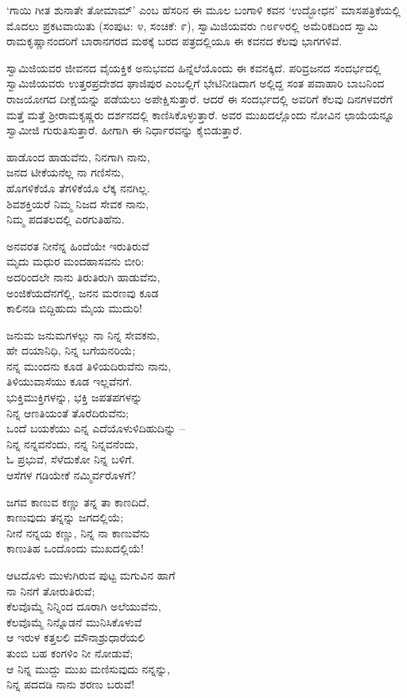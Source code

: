 ‘ಗಾಯಿ ಗೀತ ಶುನಾತೇ ತೋಮಾಮ್’ ಎಂಬ ಹೆಸರಿನ ಈ ಮೂಲ ಬಂಗಾಳಿ ಕವನ ‘ಉದ್ಭೋಧನ’ ಮಾಸಪತ್ರಿಕೆಯಲ್ಲಿ ಮೊದಲು ಪ್ರಕಟವಾಯಿತು (ಸಂಪುಟ: ೪, ಸಂಚಿಕೆ: ೯), ಸ್ವಾಮಿಜಿಯವರು ೧೮೯೪ರಲ್ಲಿ ಅಮೆರಿಕದಿಂದ ಸ್ವಾಮಿ ರಾಮಕೃಷ್ಣಾನಂದರಿಗೆ ಬಾರಾನಗರದ ಮಠಕ್ಕೆ ಬರದ ಪತ್ರದಲ್ಲಿಯೂ ಈ ಕವನದ ಕೆಲವು ಭಾಗಗಳಿವೆ.

ಸ್ವಾಮಿಜಿಯವರ ಜೀವನದ ವೈಯಕ್ತಿಕ ಅನುಭವದ ಹಿನ್ನೆಲೆಯೊಂದು ಈ ಕವನಕ್ಕಿದೆ. ಪರಿವ್ರಜನದ ಸಂದರ್ಭದಲ್ಲಿ ಸ್ವಾಮಿಜಿಯವರು ಉತ್ತರಪ್ರದೇಶದ ಘಾಜಿಪುರ ಎಂಬಲ್ಲಿಗೆ ಭೇಟಿನೀಡಿದಾಗ ಅಲ್ಲಿದ್ದ ಸಂತ ಪವಾಹಾರಿ ಬಾಬನಿಂದ ರಾಜಯೋಗದ ದೀಕ್ಷೆಯನ್ನು ಪಡೆಯಲು ಅಪೇಕ್ಷಿಸುತ್ತಾರೆ. ಆದರೆ ಈ ಸಂದರ್ಭದಲ್ಲಿ ಅವರಿಗೆ ಕೆಲವು ದಿನಗಳವರೆಗೆ ಮತ್ತೆ ಮತ್ತೆ ಶ‍್ರೀರಾಮಕೃಷ್ಣರು ದರ್ಶನದಲ್ಲಿ ಕಾಣಿಸಿಕೊಳ್ಳುತ್ತಾರೆ. ಅವರ ಮುಖದಲ್ಲೊಂದು ನೋವಿನ ಛಾಯೆಯನ್ನೂ ಸ್ವಾಮೀಜಿ ಗುರುತಿಸುತ್ತಾರೆ. ಹೀಗಾಗಿ ಈ ನಿರ್ಧಾರವನ್ನು ಕೈಬಿಡುತ್ತಾರೆ.

ಹಾಡೊಂದ ಹಾಡುವೆನು, ನಿನಗಾಗಿ ನಾನು,\\ಜನದ ಟೀಕೆಯನೆಲ್ಲ ನಾ ಗಣಿಸೆನು,\\ಹೊಗಳಿಕೆಯೊ ತೆಗಳಿಕೆಯೊ ಲೆಕ್ಕ ನನಗಿಲ್ಲ.\\ಶಿವಶಕ್ತಿಯರೆ ನಿಮ್ಮ ನಿಜದ ಸೇವಕ ನಾನು,\\ನಿಮ್ಮ ಪದತಲದಲ್ಲಿ ಎರಗುತಿಹೆನು.

ಅನವರತ ನೀನೆನ್ನ ಹಿಂದೆಯೇ ಇರುತಿರುವೆ\\ಮೃದು ಮಧುರ ಮಂದಹಾಸವನು ಬೀರಿ:\\ಅದರಿಂದಲೇ ನಾನು ತಿರುತಿರುಗಿ ಹಾಡುವೆನು,\\ಅಂಜಿಕೆಯದೆನಗೆಲ್ಲಿ, ಜನನ ಮರಣವು ಕೂಡ\\ಕಾಲಿನಡಿ ಬಿದ್ದಿಹುದು ಮೈಯ ಮುದುರಿ!

ಜನುಮ ಜನುಮಗಳಲ್ಲು ನಾ ನಿನ್ನ ಸೇವಕನು,\\ಹೇ ದಯಾನಿಧಿ, ನಿನ್ನ ಬಗೆಯನರಿಯೆ;\\ನನ್ನ ಮುಂದನು ಕೂಡ ತಿಳಿಯದಿರುವೆನು ನಾನು,\\ತಿಳಿಯುವಾಸೆಯು ಕೂಡ ಇಲ್ಲವೆನಗೆ.\\ಭುಕ್ತಿಮುಕ್ತಿಗಳನ್ನು, ಭಕ್ತಿ ಜಪತಪಗಳನ್ನು\\ನಿನ್ನ ಆಣತಿಯಂತೆ ತೊರೆದಿರುವೆನು;\\ಒಂದೆ ಬಯಕೆಯು ಎನ್ನ ಎದೆಯೊಳುಳಿದಿಹುದಿನ್ನು –\\ನಿನ್ನ ನನ್ನವನೆಂದು, ನನ್ನ ನಿನ್ನವನೆಂದು,\\ಓ ಪ್ರಭುವೆ, ಸೆಳೆದುಕೋ ನಿನ್ನ ಬಳಿಗೆ.\\ಆಸೆಗಳ ಗಡಿಯೇಕೆ ನಮ್ಮಿರ್ವರೊಳಗೆ?

ಜಗವ ಕಾಣುವ ಕಣ್ಣು ತನ್ನ ತಾ ಕಾಣದಿದೆ,\\ಕಾಣುವುದು ತನ್ನನ್ನು ಜಗದಲ್ಲಿಯೆ;\\ನೀನೆ ನನ್ನಯ ಕಣ್ಣು, ನಿನ್ನ ನಾ ಕಾಣುವೆನು\\ಕಾಣುತಿಹ ಒಂದೊಂದು ಮುಖದಲ್ಲಿಯೆ!

ಆಟದೊಳು ಮುಳುಗಿರುವ ಪುಟ್ಟ ಮಗುವಿನ ಹಾಗೆ\\ನಾ ನಿನಗೆ ತೋರುತಿರುವೆ;\\ಕೆಲವೊಮ್ಮೆ ನಿನ್ನಿಂದ ದೂರಾಗಿ ಅಲೆಯುವೆನು,\\ಕೆಲವೊಮ್ಮೆ ನಿನ್ನೊಡನೆ ಮುನಿಸಿಕೊಳುವೆ\\ಆ ಇರುಳ ಕತ್ತಲಲಿ ಮೌನಾಶ್ರುಧಾರೆಯಲಿ\\ತುಂಬಿ ಬಹ ಕಂಗಳಿಂ ನೀ ನೋಡುವೆ;\\ಆ ನಿನ್ನ ಮುದ್ದು ಮುಖ ಮಣಿಸುವುದು ನನ್ನನ್ನು,\\ನಿನ್ನ ಪದದಡಿ ನಾನು ಶರಣು ಬರುವೆ!

